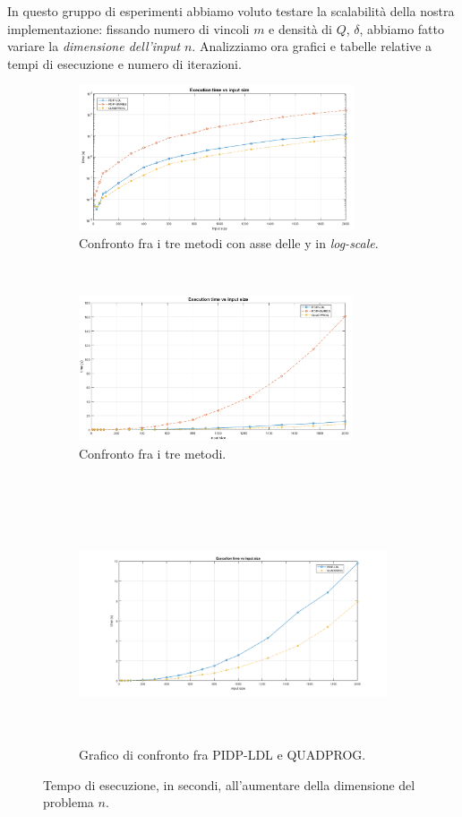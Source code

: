  In questo gruppo di esperimenti abbiamo voluto testare la scalabilità della nostra implementazione: fissando numero di vincoli $m$ e densità di $Q$, $\delta$, abbiamo fatto variare la \textit{dimensione dell'input} $n$. Analizziamo ora grafici e tabelle relative a tempi di esecuzione e numero di iterazioni. 

\begin{figure}[h!]
    \centering
    \begin{subfigure}[h]{0.5\textwidth}
        \centering
        \includegraphics[height=4.3cm]{img/MU1.png}
    \caption{Confronto fra i tre metodi con asse delle y in \textit{log-scale}.\label{fig:exp111}}
    \end{subfigure}%
    ~ 
    \begin{subfigure}[h]{0.5\textwidth}
        \centering
               \includegraphics[height=4.3cm]{img/MU10.png}
    \caption{Confronto fra i tre metodi. \label{fig:exp112}}
    \end{subfigure}
    ~\newline
     \begin{subfigure}[h]{0.8\textwidth}
        \centering
                \includegraphics[height=7cm]{img/MU11.png}
    \caption{Grafico di confronto fra PIDP-LDL e QUADPROG. \label{fig:exp113}}
    \end{subfigure}
    \caption{Tempo di esecuzione, in secondi, all'aumentare della dimensione del problema $n$. \label{fig:exp1}}
\end{figure}



